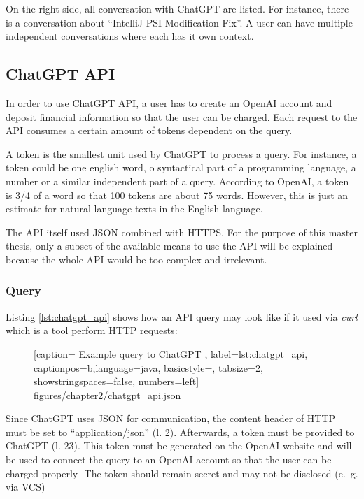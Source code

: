     On the right side, all conversation with ChatGPT are listed. For instance, there is a conversation about \enquote{IntelliJ PSI Modification Fix}. A user can have multiple independent conversations where each has it own context. 

\subsection{ChatGPT API}
In order to use ChatGPT \ac{API}, a user has to create an OpenAI account and deposit financial information so that the user can be charged. Each request to the API consumes a certain amount of tokens dependent on the query. 

A token is the smallest unit used by ChatGPT to process a query. For instance, a token could be one english word, o syntactical part of a programming language, a number or a similar independent part of a query. According to OpenAI, a token is 3/4 of a word so that 100 tokens are about 75 words. However, this is just an estimate for natural language texts in the English language. 

The \ac{API} itself used JSON combined with HTTPS. For the purpose of this master thesis, only a subset of the available means to use the \ac{API} will be explained because the whole \ac{API} would be too complex and irrelevant. 

\subsubsection{Query}
Listing \ref{lst:chatgpt_api} shows how an \ac{API} query may look like if it used via \textit{curl} which is a tool perform HTTP requests:
 \begin{figure} [htbp!]
			
			[caption={ Example query to ChatGPT  \cite{ChatGPT_url}},
			label={lst:chatgpt_api},
			captionpos=b,language=java, basicstyle=\footnotesize, tabsize=2, showstringspaces=false,  numbers=left]
			{figures/chapter2/chatgpt_api.json}
		\end{figure}
 

Since ChatGPT uses \ac{JSON} for communication, the content header of HTTP  must be set to \enquote{application/json} (l. 2). Afterwards, a token must be provided to ChatGPT (l. 23). This  token must be generated on the OpenAI website and will be used to connect the query to an OpenAI account so that the user can be charged properly- The token should remain secret and may not be disclosed (e.~g. via \ac{VCS}) 

